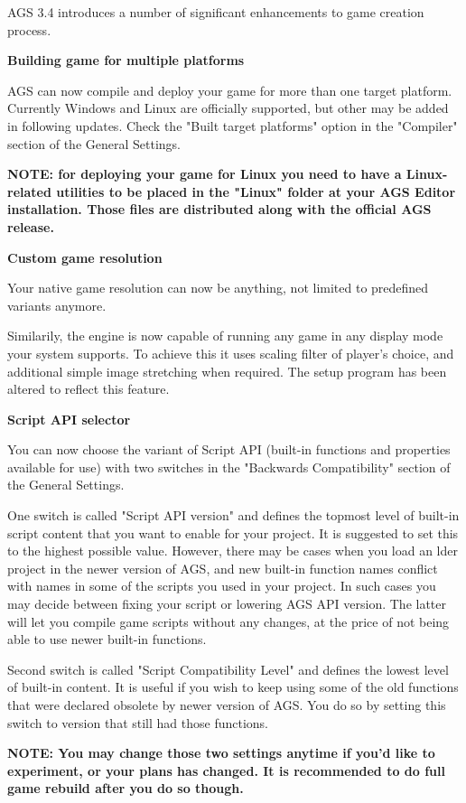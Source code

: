 AGS 3.4 introduces a number of significant enhancements to game creation process.

\bf{Building game for multiple platforms}

AGS can now compile and deploy your game for more than one target platform. Currently Windows and
Linux are officially supported, but other may be added in following updates. Check the "Built target platforms"
option in the "Compiler" section of the General Settings.

\bf{NOTE:} for deploying your game for Linux you need to have a Linux-related utilities to be placed in the
"Linux" folder at your AGS Editor installation. Those files are distributed along with the official AGS
release.

\bf{Custom game resolution}

Your native game resolution can now be anything, not limited to predefined variants anymore.

Similarily, the engine is now capable of running any game in any display mode your system supports.
To achieve this it uses scaling filter of player's choice, and additional simple image stretching
when required. The setup program has been altered to reflect this feature.

\bf{Script API selector}

You can now choose the variant of Script API (built-in functions and properties available for use)
with two switches in the "Backwards Compatibility" section of the General Settings.

One switch is called "Script API version" and defines the topmost level of built-in script content
that you want to enable for your project. It is suggested to set this to the highest possible
value. However, there may be cases when you load an lder project in the newer version of AGS,
and new built-in function names conflict with names in some of the scripts you used in your
project. In such cases you may decide between fixing your script or lowering AGS API version.
The latter will let you compile game scripts without any changes, at the price of not being able
to use newer built-in functions.

Second switch is called "Script Compatibility Level" and defines the lowest level of built-in
content. It is useful if you wish to keep using some of the old functions that were declared
obsolete by newer version of AGS. You do so by setting this switch to version that still had
those functions.

\bf{NOTE:} You may change those two settings anytime if you'd like to experiment, or your plans
has changed. It is recommended to do full game rebuild after you do so though.

